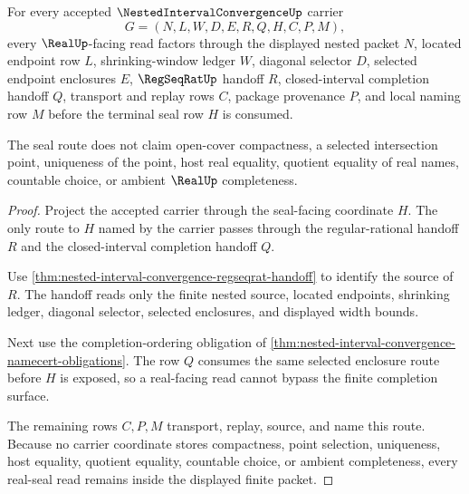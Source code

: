 \begin{theorem}
\label{thm:nested-interval-convergence-real-seal-nonescape}
For every accepted $\NestedIntervalConvergenceUp$ carrier
$$
G=(N,L,W,D,E,R,Q,H,C,P,M),
$$
every $\RealUp$-facing read factors through the displayed nested packet $N$, located endpoint row $L$, shrinking-window ledger $W$, diagonal selector $D$, selected endpoint enclosures $E$, $\RegSeqRatUp$ handoff $R$, closed-interval completion handoff $Q$, transport and replay rows $C$, package provenance $P$, and local naming row $M$ before the terminal seal row $H$ is consumed.

The seal route does not claim open-cover compactness, a selected intersection point, uniqueness of the point, host real equality, quotient equality of real names, countable choice, or ambient $\RealUp$ completeness.
\end{theorem}
\begin{proof}
Project the accepted carrier through the seal-facing coordinate $H$. The only route to $H$ named by the carrier passes through the regular-rational handoff $R$ and the closed-interval completion handoff $Q$.

Use \autoref{thm:nested-interval-convergence-regseqrat-handoff} to identify the source of $R$. The handoff reads only the finite nested source, located endpoints, shrinking ledger, diagonal selector, selected enclosures, and displayed width bounds.

Next use the completion-ordering obligation of \autoref{thm:nested-interval-convergence-namecert-obligations}. The row $Q$ consumes the same selected enclosure route before $H$ is exposed, so a real-facing read cannot bypass the finite completion surface.

The remaining rows $C,P,M$ transport, replay, source, and name this route. Because no carrier coordinate stores compactness, point selection, uniqueness, host equality, quotient equality, countable choice, or ambient completeness, every real-seal read remains inside the displayed finite packet.
\end{proof}


